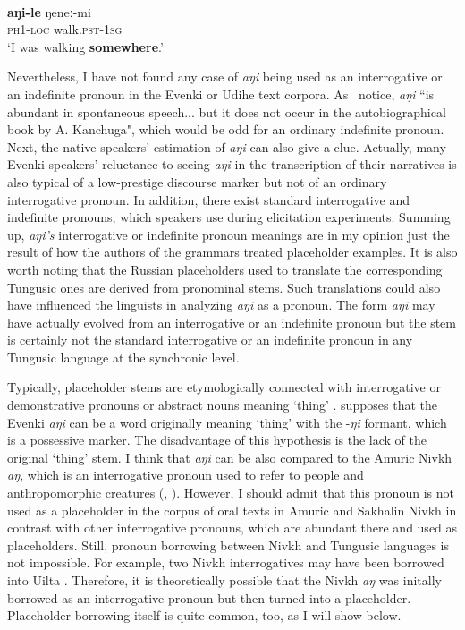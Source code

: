\documentclass[output=paper,colorlinks,citecolor=brown
\ChapterDOI{10.5281/zenodo.15697577}
]{langscibook}
\begin{document}
 \ea \label{ex.udihe.nikolaeva_tolskaya}
 \\
 \gll \textbf{aŋi-le} ŋeneː-mi\\
 \textsc{ph1}-\textsc{loc} walk.\textsc{pst}-\textsc{1sg}\\
 \glt `I was walking \textbf{somewhere}.'
 \z
{}

Nevertheless, I have not found any case of \textit{aŋi} being used as an interrogative or an indefinite pronoun in the Evenki or Udihe text corpora. As~\citet{tolskaya2008question} notice, \textit{aŋi} ``is abundant in spontaneous speech... but it does not occur in the autobiographical book by A. Kanchuga", which would be odd for an ordinary indefinite pronoun. Next, the native speakers' estimation of \textit{aŋi} can also give a clue. Actually, many Evenki speakers' reluctance to seeing \textit{aŋi} in the transcription of their narratives is also typical of a low-prestige discourse marker but not of an ordinary interrogative pronoun. In addition, there exist standard interrogative and indefinite pronouns, which speakers use during elicitation experiments. Summing up, \textit{aŋi's} interrogative or indefinite pronoun meanings are in my opinion just the result of how the authors of the grammars treated placeholder examples. It is also worth noting that the Russian placeholders used to translate the corresponding Tungusic ones are derived from pronominal stems. Such translations could also have influenced the linguists in analyzing \textit{aŋi} as a pronoun. The form \textit{aŋi} may have actually evolved from an interrogative or an indefinite pronoun but the stem is certainly not the standard interrogative or an indefinite pronoun in any Tungusic language at the synchronic level.


Typically, placeholder stems are etymologically connected with interrogative or demonstrative pronouns or abstract nouns meaning `thing' \citep{Podlesskaya2010}. \citet{idiatov2007typology} supposes that the Evenki \textit{aŋi} can be a word originally meaning `thing' with the -\textit{ŋi} formant, which is a possessive marker. The disadvantage of this hypothesis is the lack of the original `thing' stem. I think that \textit{aŋi} can be also compared to the Amuric Nivkh \textit{aŋ}, which is an interrogative pronoun used to refer to people and anthropomorphic creatures (\citealt[253]{panfilov1965}, \citealt[33]{taksami1970}). However, I should admit that this pronoun is not used as a placeholder in the corpus of oral texts in Amuric and Sakhalin Nivkh \citep{smnnivkh} in contrast with other interrogative pronouns, which are abundant there and used as placeholders. Still, pronoun borrowing between Nivkh and Tungusic languages is not impossible. For example, two Nivkh interrogatives may have been borrowed into Uilta \citep[120]{holzl2018typology}. Therefore, it is theoretically possible that the Nivkh \textit{aŋ} was initally borrowed as an interrogative pronoun but then turned into a placeholder. Placeholder borrowing itself is quite common, too, as I will show below.
\end{document}

